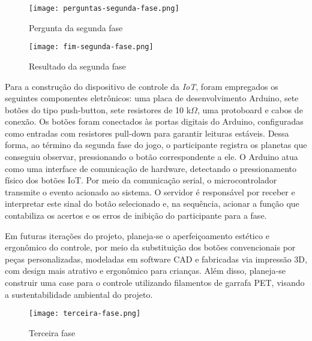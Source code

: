 \begin{figure}[H]
    \centering
    \caption{Pergunta da segunda fase}%
    \label{fig:perguntas-segunda-fase}
    \texttt{[image: perguntas-segunda-fase.png]}%
\end{figure}

\begin{figure}[H]
    \centering
    \caption{Resultado da segunda fase}%
    \label{fig:fim-segunda-fase}
    \texttt{[image: fim-segunda-fase.png]}%
\end{figure}

Para a construção do dispositivo de controle da \textit{IoT}, foram empregados os seguintes componentes eletrônicos: uma placa de desenvolvimento Arduino, sete botões do tipo push-button, sete resistores de 10 k$\Omega$, uma protoboard e cabos de conexão. Os botões foram conectados às portas digitais do Arduino, configuradas como entradas com resistores pull-down para garantir leituras estáveis. Dessa forma, ao término da segunda fase do jogo, o participante registra os planetas que conseguiu observar, pressionando o botão correspondente a ele. O Arduino atua como uma interface de comunicação de hardware, detectando o pressionamento físico dos botões IoT. Por meio da comunicação serial, o microcontrolador transmite o evento acionado ao sistema. O servidor é responsável por receber e interpretar este sinal do botão selecionado e, na sequência, acionar a função que contabiliza os acertos e os erros de inibição do participante para a fase.

Em futuras iterações do projeto, planeja-se o aperfeiçoamento estético e ergonômico do controle, por meio da substituição dos botões convencionais por peças personalizadas, modeladas em software CAD e fabricadas via impressão 3D, com design mais atrativo e ergonômico para crianças. Além disso, planeja-se construir uma case para o controle utilizando filamentos de garrafa PET, visando a sustentabilidade ambiental do projeto.

\begin{figure}[H]
    \centering
    \caption{Terceira fase}%
    \label{fig:terceira-fase}
    \texttt{[image: terceira-fase.png]}%
\end{figure}

